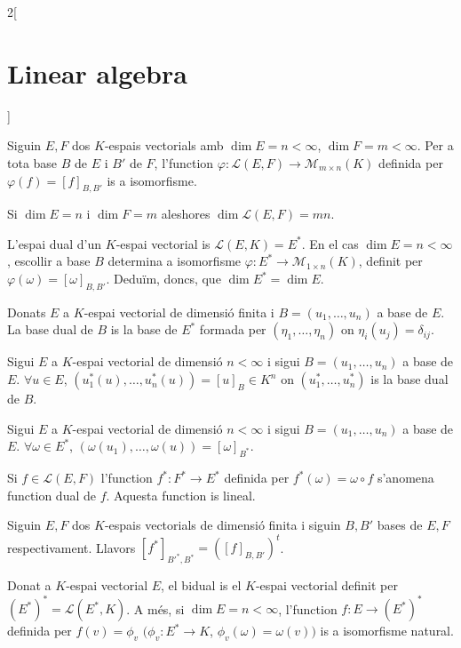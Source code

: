 \documentclass[../../../main.tex]{subfiles}
\begin{document}
\begin{multicols}{2}[\section{Linear algebra}]
\begin{lemma}
\end{lemma}
\begin{prop}
Siguin $E,F$ dos $K$-espais vectorials amb $\dim E=n<\infty$, $\dim F=m<\infty$. Per a tota base $B$ de $E$ i $B'$ de $F$, l'function $\varphi:\mathcal{L}(E,F)\rightarrow\mathcal{M}_{m\times n}(K)$ definida per $\varphi(f)=[f]_{B,B'}$ is a isomorfisme.
\end{prop}
\begin{corollary}
Si $\dim E=n$ i $\dim F=m$ aleshores $\dim \mathcal{L}(E,F)=mn$.
\end{corollary}
\begin{definition}
L'espai dual d'un $K$-espai vectorial is $\mathcal{L}(E,K)=E^*$. En el cas $\dim E=n<\infty$, escollir a base $B$ determina a isomorfisme $\varphi:E^*\rightarrow\mathcal{M}_{1\times n}(K)$, definit per $\varphi(\omega)=[\omega]_{B,B'}$. Deduïm, doncs, que $\dim E^*=\dim E$.
\end{definition}
\begin{definition}
Donats $E$ a $K$-espai vectorial de dimensió finita i $B=(u_1,\ldots,u_n)$ a base de $E$. La base dual de $B$ is la base de $E^*$ formada per $(\eta_1,\ldots,\eta_n)$ on $\eta_i(u_j)=\delta_{ij}$.
\end{definition}
\begin{lemma}
Sigui $E$ a $K$-espai vectorial de dimensió $n<\infty$ i sigui $B=(u_1,\ldots,u_n)$ a base de $E$. $\forall u\in E$, $(u_1^*(u),\ldots,u_n^*(u))=[u]_B\in K^n$ on $(u_1^*,\ldots,u_n^*)$ is la base dual de $B$.
\end{lemma}
\begin{lemma}
Sigui $E$ a $K$-espai vectorial de dimensió $n<\infty$ i sigui $B=(u_1,\ldots,u_n)$ a base de $E$. $\forall \omega\in E^*$, $(\omega(u_1),\ldots,\omega(u))=[\omega]_{B^*}$.
\end{lemma}
\begin{definition}
Si $f\in \mathcal{L}(E,F)$ l'function $f^*:F^*\rightarrow E^*$ definida per $f^*(\omega)=\omega\circ f$ s'anomena function dual de $f$. Aquesta function is lineal.
\end{definition}
\begin{theorem}
Siguin $E,F$ dos $K$-espais vectorials de dimensió finita i siguin $B,B'$ bases de $E,F$ respectivament. Llavors $[f^*]_{B'^*,B^*}=([f]_{B,B'})^t$.
\end{theorem}
\begin{definition}
Donat a $K$-espai vectorial $E$, el bidual is el $K$-espai vectorial definit per $(E^*)^*=\mathcal{L}(E^*,K)$. A més, si $\dim E=n<\infty$, l'function $f:E\rightarrow (E^*)^*$ definida per $f(v)=\phi_v$ $(\phi_v:E^*\rightarrow K$, $\phi_v(\omega)=\omega(v))$ is a isomorfisme natural. 

\end{definition}
\end{multicols}
\end{document}
